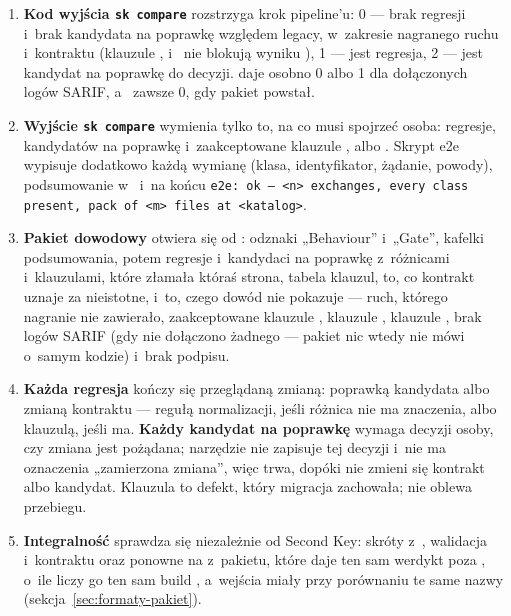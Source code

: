\begin{enumerate}
  \item \textbf{Kod wyjścia \texttt{sk compare}} rozstrzyga krok pipeline'u: 0 --- brak regresji
        i~brak kandydata na poprawkę względem legacy, w~zakresie nagranego ruchu i~kontraktu
        (klauzule ,  i~
        nie blokują wyniku ), 1 --- jest regresja, 2 --- jest kandydat na poprawkę do
        decyzji.  daje osobno 0 albo 1 dla dołączonych logów SARIF, a~
        zawsze 0, gdy pakiet powstał.
  \item \textbf{Wyjście \texttt{sk compare}} wymienia tylko to, na co musi spojrzeć osoba:
        regresje, kandydatów na poprawkę i~zaakceptowane klauzule ,
         albo . Skrypt e2e wypisuje dodatkowo każdą
        wymianę (klasa, identyfikator, żądanie, powody), podsumowanie w~ i~na końcu \texttt{e2e: ok — <n> exchanges, every
        class present, pack of <m> files at <katalog>}.
  \item \textbf{Pakiet dowodowy} otwiera się od : odznaki „Behaviour”
        i~„Gate”, kafelki podsumowania, potem regresje i~kandydaci na poprawkę z~różnicami i~klauzulami, które złamała któraś strona, tabela klauzul, to, co kontrakt uznaje za
        nieistotne, i~to, czego dowód nie pokazuje --- ruch, którego nagranie nie
        zawierało, zaakceptowane klauzule , klauzule
        , klauzule , brak logów SARIF (gdy
        nie dołączono żadnego --- pakiet nic wtedy nie mówi o~samym kodzie) i~brak podpisu.
  \item \textbf{Każda regresja} kończy się przeglądaną zmianą: poprawką kandydata albo zmianą
        kontraktu --- regułą normalizacji, jeśli różnica nie ma znaczenia, albo klauzulą, jeśli
        ma. \textbf{Każdy kandydat na poprawkę} wymaga decyzji osoby, czy zmiana jest
        pożądana; narzędzie nie zapisuje tej decyzji i~nie ma oznaczenia „zamierzona zmiana”,
        więc  trwa, dopóki nie zmieni się kontrakt albo kandydat. Klauzula
         to defekt, który migracja zachowała; nie
        oblewa przebiegu.
  \item \textbf{Integralność} sprawdza się niezależnie od Second Key: skróty z~, walidacja  i~kontraktu oraz ponowne
         na  z~pakietu, które daje ten sam werdykt
        poza , o~ile liczy go ten sam build , a~wejścia miały
        przy porównaniu te same nazwy (sekcja~\ref{sec:formaty-pakiet}).
\end{enumerate}

